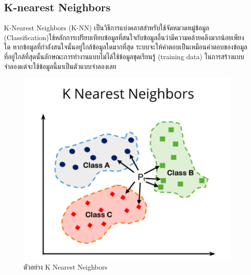 \FloatBarrier

\subsection{K-nearest Neighbors}
K-Nearest Neighbors (K-NN) เป็นวิธีการแบ่งคลาสสำหรับใช้จัดหมวดหมู่ข้อมูล (Classification)ใช้หลักการเปรียบเทียบข้อมูลที่สนใจกับข้อมูลอื่นว่ามีความคล้ายคลึงมากน้อยเพียงใด หากข้อมูลที่กำลังสนใจนั้นอยู่ใกล้ข้อมูลใดมากที่สุด ระบบจะให้คำตอบเป็นเหมือนคำตอบของข้อมูลที่อยู่ใกล้ที่สุดนั้นลักษณะการทำงานแบบไม่ได้ใช้ข้อมูลชุดเรียนรู้ (training data) ในการสร้างแบบจำลองแต่จะใช้ข้อมูลนี้มาเป็นตัวแบบจำลองเลย
\cite{KNN}
\begin{figure}[h] %
    \begin{center}
        \includegraphics[width=0.4\linewidth]{image/knn.png}
    \end{center}
    \caption[ตัวอย่าง K Nearest Neighbors]{ตัวอย่าง K Nearest Neighbors}
    \label{fig:knn}
\end{figure}










